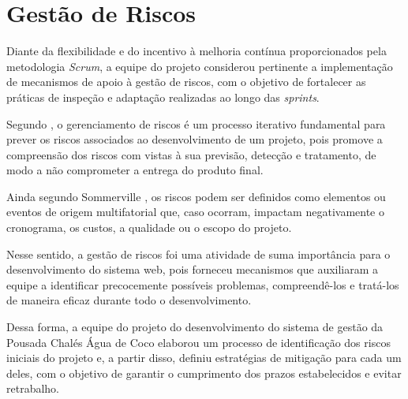 \documentclass[
	12pt,				%
	openany,			%
	twoside,			%
	a4paper,			%
	english,			%
	french,				%
	spanish,			%
	brazil				%
	]{abntex2}
\begin{document}
\section{Gestão de Riscos}
Diante da flexibilidade e do incentivo à melhoria contínua proporcionados pela metodologia \textit{Scrum}, a equipe do projeto considerou pertinente a implementação de mecanismos de apoio à gestão de riscos, com o objetivo de fortalecer as práticas de inspeção e adaptação realizadas ao longo das \textit{sprints}.

Segundo \cite[p. 416]{sommerville2011}, o gerenciamento de riscos é um processo iterativo fundamental para prever os riscos associados ao desenvolvimento de um projeto, pois promove a compreensão dos riscos com vistas à sua previsão, detecção e tratamento, de modo a não comprometer a entrega do produto final.

Ainda segundo Sommerville \cite[p. 416]{sommerville2011},  os riscos podem ser definidos como elementos ou eventos de origem multifatorial que, caso ocorram, impactam negativamente  o cronograma, os custos, a qualidade ou o escopo do projeto.

Nesse sentido, a gestão de riscos foi uma atividade de suma importância para o desenvolvimento do sistema web, pois forneceu mecanismos que auxiliaram a equipe a identificar precocemente possíveis problemas, compreendê-los e tratá-los de maneira eficaz durante todo o desenvolvimento. 

Dessa forma, a equipe do projeto do desenvolvimento do sistema de gestão da Pousada Chalés Água de Coco elaborou um processo de identificação dos riscos iniciais do projeto e, a partir disso, definiu estratégias de mitigação para cada um deles, com o objetivo de garantir o cumprimento dos prazos estabelecidos e evitar retrabalho.
\end{document}
